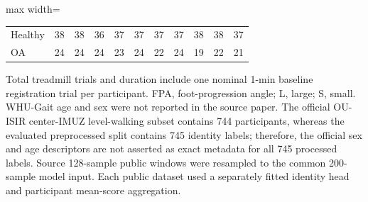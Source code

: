 \begin{table}[t]
\begin{adjustbox}{max width=\textwidth}
\begin{tabular}{lrrrrrrrrrr}
Healthy & 38 & 38 & 36 & 37 & 37 & 37 & 37 & 38 & 38 & 37 \\
OA & 24 & 24 & 24 & 23 & 24 & 22 & 24 & 19 & 22 & 21 \\
\bottomrule
\end{tabular}
\end{adjustbox}
\vspace{2pt}
\parbox{0.98\textwidth}{\footnotesize Total treadmill trials and duration include one nominal 1-min baseline registration trial per participant. FPA, foot-progression angle; L, large; S, small. WHU-Gait age and sex were not reported in the source paper. The official OU-ISIR center-IMUZ level-walking subset contains 744 participants, whereas the evaluated preprocessed split contains 745 identity labels; therefore, the official sex and age descriptors are not asserted as exact metadata for all 745 processed labels. Source 128-sample public windows were resampled to the common 200-sample model input. Each public dataset used a separately fitted identity head and participant mean-score aggregation.}
\end{table}
